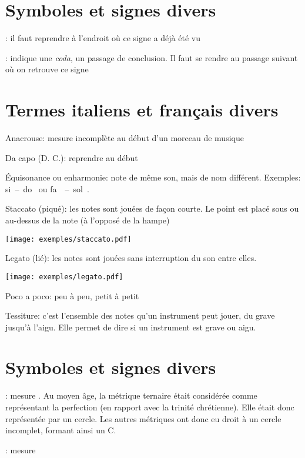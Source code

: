 \documentclass[11pt,a4paper]{scrreprt}
\begin{document}
\section{Symboles et signes divers}
\begin{description}
\item \fetasegno : il faut reprendre à l'endroit où ce signe a déjà été vu
\item \fetacoda : indique une \emph{coda}, un passage de conclusion. Il faut se rendre au passage suivant où on retrouve ce signe
\end{description}

\section{Termes italiens et français divers}
\begin{description}
\item Anacrouse: mesure incomplète au début d'un morceau de musique
\item Da capo (D. C.): reprendre au début 
\item Équisonance ou enharmonie: note de même son, mais de nom différent. Exemples: si~--~do~\fetaflat{} ou fa~\fetasharp{}~--~sol~\fetaflat.
\item Staccato (piqué): les notes sont jouées de façon courte. Le point est placé sous ou au-dessus de la note (à l'opposé de la hampe)
\item \texttt{[image: exemples/staccato.pdf]}
\item Legato (lié): les notes sont jouées sans interruption du son entre elles.
\item \texttt{[image: exemples/legato.pdf]}
\item Poco a poco: peu à peu, petit à petit

\item Tessiture: c'est l'ensemble des notes qu'un instrument peut jouer, du grave jusqu'à l'aigu. Elle permet de dire si un instrument est grave ou aigu.
\end{description}


\section{Symboles et signes divers}
\begin{description}
\item {} : mesure . Au moyen âge, la métrique ternaire était considérée comme représentant la perfection (en rapport avec la trinité chrétienne). Elle était donc représentée par un cercle. Les autres métriques ont donc eu droit à un cercle incomplet, formant ainsi un C.
\item {} : mesure 
\end{description}
\end{document}
